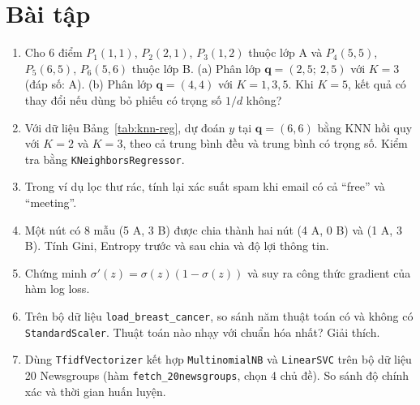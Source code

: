 \section{Bài tập}
\begin{enumerate}
    \item Cho 6 điểm $P_1(1, 1)$, $P_2(2, 1)$, $P_3(1, 2)$ thuộc lớp A và $P_4(5, 5)$, $P_5(6, 5)$, $P_6(5, 6)$ thuộc lớp B. (a) Phân lớp $\mathbf{q} = (2{,}5;\ 2{,}5)$ với $K = 3$ (đáp số: A). (b) Phân lớp $\mathbf{q} = (4, 4)$ với $K = 1, 3, 5$. Khi $K = 5$, kết quả có thay đổi nếu dùng bỏ phiếu có trọng số $1/d$ không?
    \item Với dữ liệu Bảng~\ref{tab:knn-reg}, dự đoán $y$ tại $\mathbf{q} = (6, 6)$ bằng KNN hồi quy với $K = 2$ và $K = 3$, theo cả trung bình đều và trung bình có trọng số. Kiểm tra bằng \texttt{KNeighborsRegressor}.
    \item Trong ví dụ lọc thư rác, tính lại xác suất spam khi email có cả ``free'' và ``meeting''.
    \item Một nút có 8 mẫu (5 A, 3 B) được chia thành hai nút (4 A, 0 B) và (1 A, 3 B). Tính Gini, Entropy trước và sau chia và độ lợi thông tin.
    \item Chứng minh $\sigma'(z) = \sigma(z)(1 - \sigma(z))$ và suy ra công thức gradient của hàm log loss.
    \item Trên bộ dữ liệu \texttt{load\_breast\_cancer}, so sánh năm thuật toán có và không có \texttt{StandardScaler}. Thuật toán nào nhạy với chuẩn hóa nhất? Giải thích.
    \item Dùng \texttt{TfidfVectorizer} kết hợp \texttt{MultinomialNB} và \texttt{LinearSVC} trên bộ dữ liệu 20 Newsgroups (hàm \texttt{fetch\_20newsgroups}, chọn 4 chủ đề). So sánh độ chính xác và thời gian huấn luyện.
\end{enumerate}

